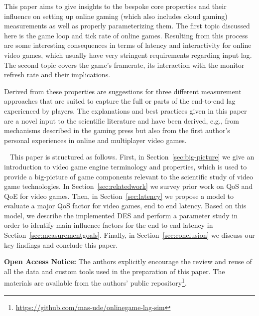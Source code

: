 
This paper aims to give insights to the bespoke core properties and their influence on setting up online gaming (which also includes cloud gaming) measurements as well as properly parameterizing them. The first topic discussed here is the game loop and tick rate of online games. Resulting from this process are some interesting consequences in terms of latency and interactivity for online video games, which usually have very stringent requirements regarding input lag. 
The second topic covers the game's framerate, its interaction with the monitor refresh rate and their implications.

Derived from these properties are suggestions for three different measurement approaches that are suited to capture the full or parts of the end-to-end lag experienced by players. The explanations and best practices given in this paper are a novel input to the scientific literature and have been derived, e.g., from mechanisms described in the gaming press but also from the first author's personal experiences in online and multiplayer video games.

~\newline
This paper is structured as follows.
First, in Section~\ref{sec:big-picture} we give an introduction to video game engine terminology and properties, which is used to provide a big-picture of game components relevant to the scientific study of video game technologies.
In Section~\ref{sec:relatedwork} we survey prior work on \gls{QoS} and \gls{QoE} for video games.
Then, in Section~\ref{sec:latency} we propose a model to evaluate a major \gls{QoS} factor for video games, end to end latency.
Based on this model, we describe the implemented \gls{DES} and perform a parameter study in order to identify main influence factors for the end to end latency in Section~\ref{sec:measurementgoals}.
Finally, in Section~\ref{sec:conclusion} we discuss our key findings and conclude this paper.

\textbf{Open Access Notice:} The authors explicitly encourage the review and reuse of all the data and custom tools used in the preparation of this paper. The materials are available from the authors' public repository\footnote{\url{https://github.com/mas-ude/onlinegame-lag-sim}}. 

